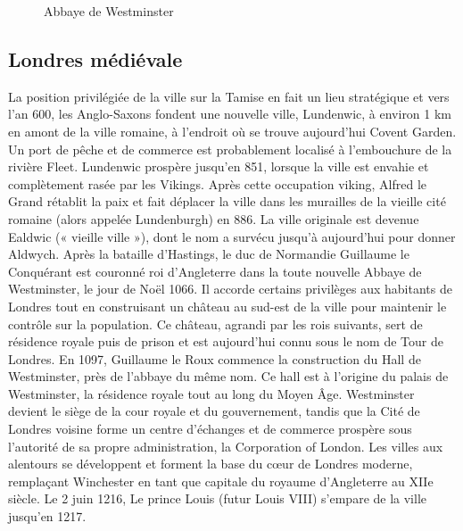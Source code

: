 \documentclass{article}
\begin{document}
\begin{figure}
\centering
{}
\caption{Abbaye de Westminster}
\label{fig:hist1}
\end{figure}

\subsection{Londres médiévale}
La position privilégiée de la ville sur la Tamise en fait un lieu stratégique et vers l'an 600, les Anglo-Saxons fondent une nouvelle ville, Lundenwic, à environ 1 km en amont de la ville romaine, à l'endroit où se trouve aujourd'hui Covent Garden. Un port de pêche et de commerce est probablement localisé à l'embouchure de la rivière Fleet. Lundenwic prospère jusqu'en 851, lorsque la ville est envahie et complètement rasée par les Vikings. Après cette occupation viking, Alfred le Grand rétablit la paix et fait déplacer la ville dans les murailles de la vieille cité romaine (alors appelée Lundenburgh) en 886. La ville originale est devenue Ealdwic (« vieille ville »), dont le nom a survécu jusqu'à aujourd'hui pour donner Aldwych.
Après la bataille d'Hastings, le duc de Normandie Guillaume le Conquérant est couronné roi d'Angleterre dans la toute nouvelle Abbaye de Westminster, le jour de Noël 1066. Il accorde certains privilèges aux habitants de Londres tout en construisant un château au sud-est de la ville pour maintenir le contrôle sur la population. Ce château, agrandi par les rois suivants, sert de résidence royale puis de prison et est aujourd'hui connu sous le nom de Tour de Londres.
En 1097, Guillaume le Roux commence la construction du Hall de Westminster, près de l'abbaye du même nom. Ce hall est à l'origine du palais de Westminster, la résidence royale tout au long du Moyen Âge. Westminster devient le siège de la cour royale et du gouvernement, tandis que la Cité de Londres voisine forme un centre d'échanges et de commerce prospère sous l'autorité de sa propre administration, la Corporation of London. Les villes aux alentours se développent et forment la base du cœur de Londres moderne, remplaçant Winchester en tant que capitale du royaume d'Angleterre au XIIe siècle.
Le 2 juin 1216, Le prince Louis (futur Louis VIII) s'empare de la ville jusqu'en 1217.
\end{document}

